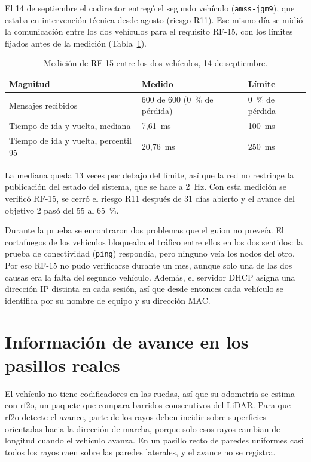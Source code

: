 \documentclass[12pt,letterpaper]{article}
\begin{document}
El 14 de septiembre el codirector entregó el segundo vehículo (\texttt{amss-jgm9}), que estaba en intervención técnica desde agosto (riesgo R11). Ese mismo día se midió la comunicación entre los dos vehículos para el requisito RF-15, con los límites fijados antes de la medición (Tabla~\ref{tab:rf15}).

\begin{table}[H]
    \centering
    \small
    \caption{Medición de RF-15 entre los dos vehículos, 14 de septiembre.}
    \label{tab:rf15}
    \begin{tabular}{@{}p{5.6cm}p{4.4cm}p{3.6cm}@{}}
        \toprule
        \textbf{Magnitud} & \textbf{Medido} & \textbf{Límite} \\ \midrule
        Mensajes recibidos & 600 de 600 (0~\% de pérdida) & 0~\% de pérdida \\ \addlinespace
        Tiempo de ida y vuelta, mediana & 7,61~ms & 100~ms \\ \addlinespace
        Tiempo de ida y vuelta, percentil 95 & 20,76~ms & 250~ms \\ \bottomrule
    \end{tabular}
\end{table}

La mediana queda 13 veces por debajo del límite, así que la red no restringe la publicación del estado del sistema, que se hace a 2~Hz. Con esta medición se verificó RF-15, se cerró el riesgo R11 después de 31 días abierto y el avance del objetivo 2 pasó del 55 al 65~\%.

Durante la prueba se encontraron dos problemas que el guion no preveía. El cortafuegos de los vehículos bloqueaba el tráfico entre ellos en los dos sentidos: la prueba de conectividad (\texttt{ping}) respondía, pero ninguno veía los nodos del otro. Por eso RF-15 no pudo verificarse durante un mes, aunque solo una de las dos causas era la falta del segundo vehículo. Además, el servidor DHCP asigna una dirección IP distinta en cada sesión, así que desde entonces cada vehículo se identifica por su nombre de equipo y su dirección MAC.

\section{Información de avance en los pasillos reales}
\label{sec:pisos}

El vehículo no tiene codificadores en las ruedas, así que su odometría se estima con rf2o, un paquete que compara barridos consecutivos del LiDAR. Para que rf2o detecte el avance, parte de los rayos deben incidir sobre superficies orientadas hacia la dirección de marcha, porque solo esos rayos cambian de longitud cuando el vehículo avanza. En un pasillo recto de paredes uniformes casi todos los rayos caen sobre las paredes laterales, y el avance no se registra.
\end{document}
